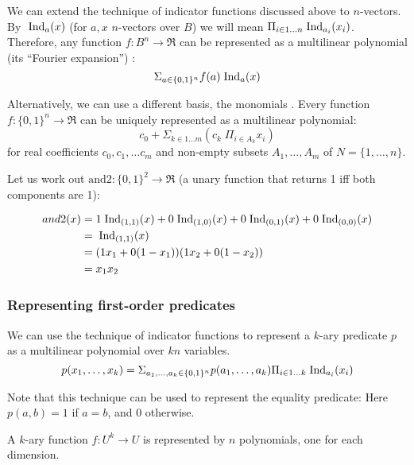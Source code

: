 \documentclass{article} %
\begin{document}
We can extend the technique of indicator functions discussed above to $n$-vectors. By $\;\mbox{Ind}_a(x)$ (for $a,x$ $n$-vectors over \(B\)) we will mean \(\Pi_{i   \in 1\ldots n} \;\mbox{Ind}_{a_i}(x_i)\).  Therefore, any function \(f:B^n \rightarrow \Re\) can be represented as a multilinear polynomial (its ``Fourier expansion'') \cite{boolean-function}: 
\begin{equation}\label{eqn:fourier-expansion}
\Sigma_{a \in \{0,1\}^n} f(a)\;\mbox{Ind}_{a}(x)
\end{equation}


Alternatively, we can use a different basis, the monomials \cite{PB-optimization}. Every
function $f:\{0,1\}^n \rightarrow \Re$ can be uniquely represented as a multilinear polynomial: 
$$ c_0 + \Sigma_{k \in 1\ldots m} (c_k\; \Pi_{i \in A_k} x_i)$$
\noindent for real coefficients $c_0, c_1, \ldots c_m$ and non-empty subsets $A_1, \ldots, A_m$ of $N = \{1, \ldots, n\}$. 

\begin{example}
Let us work out $\mbox{and2}: \{0,1\}^2 \rightarrow \Re$ (a unary function that returns 1 iff both components are 1):

\begin{align*}
and2(x)  &= 1 \;\mbox{Ind}_{(1,1)}(x) + 0\;\mbox{Ind}_{(1,0)}(x) + 0\;\mbox{Ind}_{(0,1)}(x) + 0\;\mbox{Ind}_{(0,0)}(x)\\
&= \;\mbox{Ind}_{(1,1)}(x) \\
&= (1  x_1+0(1-x_1))(1  x_2+0(1-x_2))\\
  &=x_1 x_2 
\end{align*}
\end{example}

\subsubsection{Representing first-order predicates}
We can use the technique of indicator functions to represent a $k$-ary predicate $p$ as a multilinear polynomial over $kn$ variables. 
$$p(x_1,\ldots, x_k)= \Sigma_{a_1,\ldots,a_k \in \{0,1\}^n} p(a_1, \ldots, a_k)  \Pi_{i \in 1\ldots k} \;\mbox{Ind}_{a_i}(x_i)$$

\noindent Note that this technique can be used to represent the equality predicate: Here $p(a,b)=1$ if $a=b$, and $0$ otherwise.

A $k$-ary function $f:U^k \rightarrow U$ is represented by $n$ polynomials, one for each dimension.
\end{document}
